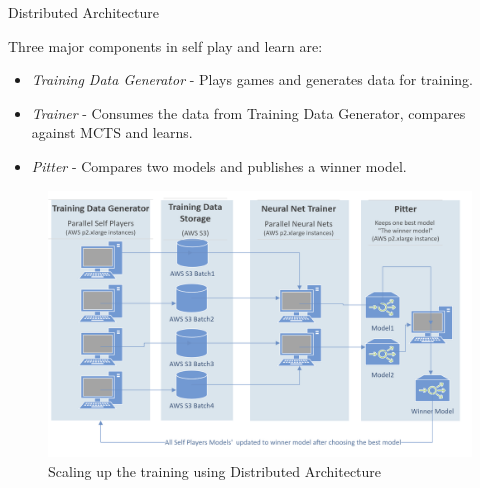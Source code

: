 \documentclass[final]{beamer}
\newlength{\onecolwid}
\newlength{\twocolwid}
\begin{document}
\begin{frame}[t]
\begin{columns}[t]
\begin{column}{\twocolwid}
\begin{columns}[t,totalwidth=\twocolwid] %

\begin{column}{\onecolwid}\vspace{-.6in} %


\begin{block}{Distributed Architecture}

Three major components in self play and learn are:

\begin{itemize}
\item \emph{Training Data Generator} - Plays games and generates data for training.
\item \emph{Trainer} - Consumes the data from Training Data Generator, compares against MCTS and learns.
\item \emph{Pitter} - Compares two models and publishes a winner model.
\end{itemize}
\begin{figure}
\includegraphics[width=1.0\linewidth]{distributed_arch.png}
\caption{Scaling up the training using Distributed Architecture}
\end{figure}

\end{block}

\begin{column}{\onecolwid} %


\end{column}
\end{column}
\end{columns}
\end{column}
\end{columns}
\end{frame}
\end{document}

